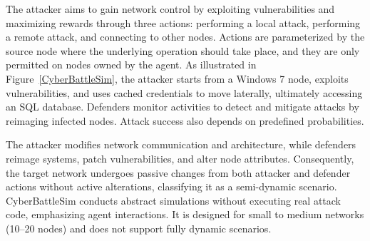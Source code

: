 
The attacker aims to gain network control by exploiting vulnerabilities and maximizing rewards through three actions: performing a local attack, performing a remote attack, and connecting to other nodes. Actions are parameterized by the source node where the underlying operation should take place, and they are only permitted on nodes owned by the agent. As illustrated in Figure~\ref{CyberBattleSim}, the attacker starts from a Windows 7 node, exploits vulnerabilities, and uses cached credentials to move laterally, ultimately accessing an SQL database. Defenders monitor activities to detect and mitigate attacks by reimaging infected nodes. Attack success also depends on predefined probabilities.

The attacker modifies network communication and architecture, while defenders reimage systems, patch vulnerabilities, and alter node attributes. Consequently, the target network undergoes passive changes from both attacker and defender actions without active alterations, classifying it as a semi-dynamic scenario. CyberBattleSim conducts abstract simulations without executing real attack code, emphasizing agent interactions. It is designed for small to medium networks (10–20 nodes) and does not support fully dynamic scenarios.




